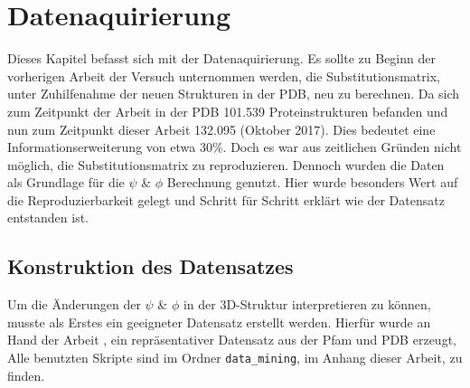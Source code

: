 \chapter[Datenaquirierung]{Datenaquirierung}
\label{chap:Datenaquirierung}

Dieses Kapitel befasst sich mit der Datenaquirierung. Es sollte zu Beginn der vorherigen Arbeit der Versuch unternommen werden, die Substitutionsmatrix, unter Zuhilfenahme der neuen Strukturen in der \ac{PDB}, neu zu berechnen. Da sich zum Zeitpunkt der Arbeit \cite{Mathias.2014} in der \ac{PDB} 101.539 Proteinstrukturen befanden und nun zum Zeitpunkt dieser Arbeit 132.095 (Oktober 2017). Dies bedeutet eine Informationserweiterung von etwa 30\%. Doch es war aus zeitlichen Gründen nicht möglich, die Substitutionsmatrix zu reproduzieren. Dennoch wurden die Daten als Grundlage für die $\psi$ \& $\phi$ Berechnung genutzt. Hier wurde besonders Wert auf die Reproduzierbarkeit gelegt und Schritt für Schritt erklärt wie der Datensatz entstanden ist.



\section{Konstruktion des Datensatzes}
\label{sec:konst}
Um die Änderungen der $\psi$ \& $\phi$ in der 3D-Struktur interpretieren zu können, musste als Erstes ein geeigneter Datensatz erstellt werden. Hierfür wurde an Hand der Arbeit \cite{Mathias.2014}, ein repräsentativer Datensatz aus der \ac{Pfam} und \ac{PDB} erzeugt, Alle benutzten Skripte sind im Ordner \texttt{data\_mining}, im Anhang dieser Arbeit, zu finden.


